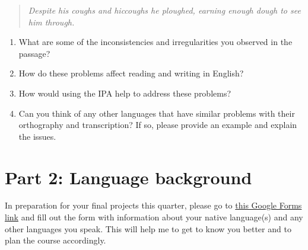 \documentclass[12pt, letterpaper]{article}
\begin{document}
\begin{quote}
    \textit{Despite his coughs and hiccoughs he ploughed, earning enough dough to see him through.}
\end{quote}

\begin{enumerate}
  \item What are some of the inconsistencies and irregularities you observed in the passage?
  \item How do these problems affect reading and writing in English?
  \item How would using the IPA help to address these problems?
  \item Can you think of any other languages that have similar problems with their orthography and transcription? If so, please provide an example and explain the issues. 
\end{enumerate}

\section*{Part 2: Language background} \label{sec:langback}

In preparation for your final projects this quarter, please go to \href{https://forms.gle/H38dVppWWiXdkRZ37}{this Google Forms link} and fill out the form with information about your native language(s) and any other languages you speak. This will help me to get to know you better and to plan the course accordingly. 




\end{document}
